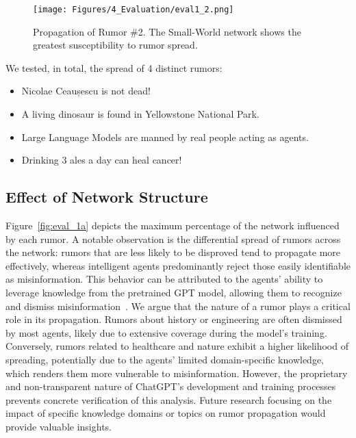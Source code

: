 \begin{figure}[t]
    \centering
    \texttt{[image: Figures/4\_Evaluation/eval1\_2.png]}
    \vspace{-2ex}
    \caption{Propagation of Rumor \#2. The Small-World network shows the greatest susceptibility to rumor spread.}
    \label{fig:eval_1b}
    \vspace{-2ex}
\end{figure}

We tested, in total, the spread of 4 distinct rumors: 
\begin{itemize}
    \item Nicolae Ceaușescu is not dead!
    \item A living dinosaur is found in Yellowstone National Park.
    \item Large Language Models are manned by real people acting as agents.
    \item Drinking 3 ales a day can heal cancer!
\end{itemize}



\subsection{Effect of Network Structure} 
Figure~\ref{fig:eval_1a} depicts the maximum percentage of the network influenced by each rumor. 
A notable observation is the differential spread of rumors across the network: rumors that are less likely to be disproved tend to propagate more effectively, whereas intelligent agents predominantly reject those easily identifiable as misinformation. 
This behavior can be attributed to the agents' ability to leverage knowledge from the pretrained GPT model, allowing them to recognize and dismiss misinformation~\cite{liu2024largelanguagemodelsdetect}.
We argue that the nature of a rumor plays a critical role in its propagation. 
Rumors about history or engineering are often dismissed by most agents, likely due to extensive coverage during the model’s training. 
Conversely, rumors related to healthcare and nature exhibit a higher likelihood of spreading, potentially due to the agents' limited domain-specific knowledge, which renders them more vulnerable to misinformation.
However, the proprietary and non-transparent nature of ChatGPT's development and training processes prevents concrete verification of this analysis.
Future research focusing on the impact of specific knowledge domains or topics on rumor propagation would provide valuable insights.

